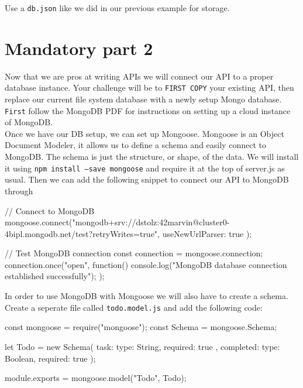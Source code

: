 \documentclass{42-en}
\begin{document}
Use a \texttt{db.json} like we did in our previous example for storage.

\newpage

\chapter{Mandatory part 2}

Now that we are pros at writing APIs we will connect our API to a proper database instance. Your challenge will be to \texttt{FIRST COPY} your existing API, then replace our current file system database with a newly setup Mongo database.\\

\texttt{First} follow the MongoDB PDF for instructions on setting up a cloud instance of MongoDB.\\

Once we have our DB setup, we can set up Mongoose. Mongoose is an Object Document Modeler, it allows us to define a schema and easily connect to MongoDB. The schema is just the structure, or shape, of the data. We will install it using \texttt{npm install --save mongoose} and require it at the top of server.js as usual. Then we can add the following snippet to connect our API to MongoDB through 

\begin{42jscode}
	// Connect to MongoDB
	mongoose.connect("mongodb+srv://dstolz:42marvin@cluster0-4bipl.mongodb.net/test?retryWrites=true",
	{ useNewUrlParser: true }
	);
	
	// Test MongoDB connection
	const connection = mongoose.connection;
	connection.once("open", function() {
		console.log("MongoDB database connection established successfully");
	});
	\end{42jscode}
	
	In order to use MongoDB with Mongoose we will also have to create a schema. Create a seperate file called \texttt{todo.model.js} and add the following code:
	
	\begin{42jscode}
        const mongoose = require("mongoose");
        const Schema = mongoose.Schema;

        let Todo = new Schema({
            task: {
                type: String,
                required: true
            },
            completed: {
                type: Boolean,
                required: true
            }
        });
                    
        module.exports = mongoose.model("Todo", Todo);
    \end{42jscode}
    
\end{document}
